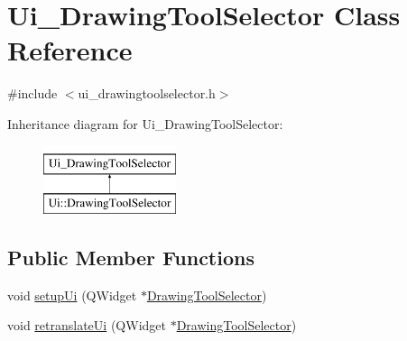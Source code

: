 \hypertarget{class_ui___drawing_tool_selector}{}\section{Ui\+\_\+\+Drawing\+Tool\+Selector Class Reference}
\label{class_ui___drawing_tool_selector}


{\ttfamily \#include $<$ui\+\_\+drawingtoolselector.\+h$>$}

Inheritance diagram for Ui\+\_\+\+Drawing\+Tool\+Selector\+:\begin{figure}[H]
\begin{center}
\leavevmode
\includegraphics[height=2.000000cm]{class_ui___drawing_tool_selector}
\end{center}
\end{figure}
\subsection*{Public Member Functions}
\begin{DoxyCompactItemize}
\item 
void \hyperlink{class_ui___drawing_tool_selector_a370b1b8993d9c70f9da3d90e53a78686}{setup\+Ui} (Q\+Widget $\ast$\hyperlink{class_drawing_tool_selector}{Drawing\+Tool\+Selector})
\item 
void \hyperlink{class_ui___drawing_tool_selector_a3e822961e2773564eda0c30b90a25425}{retranslate\+Ui} (Q\+Widget $\ast$\hyperlink{class_drawing_tool_selector}{Drawing\+Tool\+Selector})
\end{DoxyCompactItemize}
